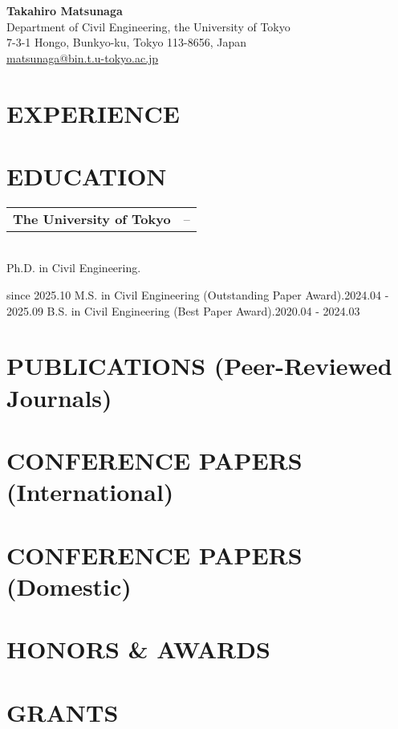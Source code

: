 \documentclass[uplatex,a4paper,10pt]{jsarticle}
\makeatletter
\newcommand{\cvitem}[3]{%
  \begin{tabular*}{\textwidth}{@{}p{0.72\textwidth}@{\extracolsep{\fill}}p{0.25\textwidth}@{}}
    \textbf{#1} & \raggedleft #2 \\
  \end{tabular*}\\[-2pt]
  #3\par\vspace{4pt}
}
\newcommand{\cvheader}[3]{%
  {\LARGE \textbf{#1}}\\[4pt]
  #2\\
  #3
}
\makeatother
\begin{document}
\cvheader{Takahiro Matsunaga}
{Department of Civil Engineering, the University of Tokyo}
{7-3-1 Hongo, Bunkyo-ku, Tokyo 113-8656, Japan} \\
{\href{mailto:matsunaga@bin.t.u-tokyo.ac.jp}{matsunaga@bin.t.u-tokyo.ac.jp}}
\vspace{8pt}

\section*{EXPERIENCE}

\section*{EDUCATION}
\cvitem{The University of Tokyo}{2020--}
{Ph.D. in Civil Engineering.}{since 2025.10}
{M.S. in Civil Engineering (Outstanding Paper Award).}{2024.04 - 2025.09}
{B.S. in Civil Engineering (Best Paper Award).}{2020.04 - 2024.03}

\section*{PUBLICATIONS (Peer-Reviewed Journals)}
\printbibliography[filter=journal_papers, heading=none]

\section*{CONFERENCE PAPERS (International)}
\printbibliography[filter=conf-intl, heading=none]

\section*{CONFERENCE PAPERS (Domestic)}
\printbibliography[filter=conf-dom, heading=none]

\section*{HONORS \& AWARDS}
\printbibliography[filter=awards, heading=none]

\section*{GRANTS}
\printbibliography[filter=grants, heading=none]
\end{document}
